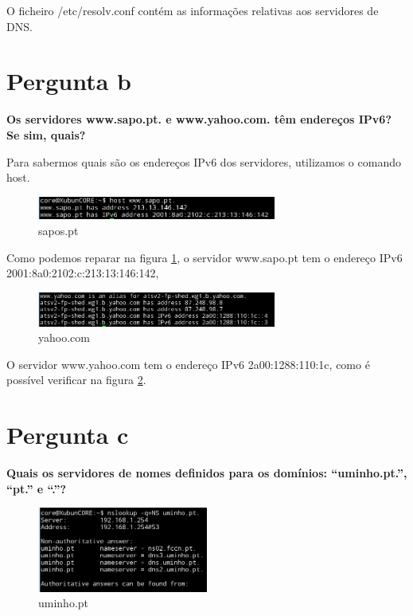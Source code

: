 \documentclass[a4paper]{report}
\begin{document}
O ficheiro /etc/resolv.conf contém as informações relativas aos servidores
de DNS.

\section{Pergunta b}
\textbf{Os servidores www.sapo.pt. e www.yahoo.com. têm endereços IPv6? Se sim,
quais?}

Para sabermos quais são os endereços IPv6 dos servidores, utilizamos o comando
host.

\begin{figure}[H]
    \centering 
    \includegraphics[width=0.7\textwidth]{images/sapopt.png}  
    \caption{sapos.pt}
    \label{fig:sapopt}
\end{figure}

Como podemos reparar na figura \ref{fig:sapopt}, o servidor www.sapo.pt tem o endereço 
IPv6 2001:8a0:2102:c:213:13:146:142,

\begin{figure}[H]
    \centering 
    \includegraphics[width=0.7\textwidth]{images/yahoocom.png}  
    \caption{yahoo.com}
    \label{fig:yahoocom}
\end{figure}

O servidor www.yahoo.com tem o endereço IPv6 2a00:1288:110:1c, como é
possível verificar na figura \ref{fig:yahoocom}.

\section{Pergunta c}
\textbf{Quais os servidores de nomes definidos para os domínios: “uminho.pt.”,
“pt.” e “.”?}
\begin{figure}[H]
    \centering 
    \includegraphics[width=0.5\textwidth]{images/uminhopt.png}  
    \caption{uminho.pt}
    \label{fig:uminhopt}
\end{figure}
\end{document}
